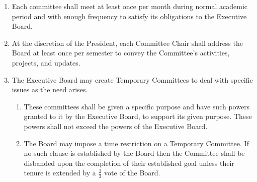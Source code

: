 \begin{enumerate}
    \item Each committee shall meet at least once per month during normal academic period and with enough frequency to satisfy its obligations to the Executive Board.

    \item At the discretion of the President, each Committee Chair shall address the Board at least once per semester to convey the Committee’s activities, projects, and updates.

    

    

    

    

    \item The Executive Board may create Temporary Committees to deal with specific issues as the need arises.
    \begin{enumerate}
        \item These committees shall be given a specific purpose and have such powers granted to it by the Executive Board, to support its given purpose. These powers shall not exceed the powers of the Executive Board.

        \item The Board may impose a time restriction on a Temporary Committee. If no such clause is established by the Board then the Committee shall be disbanded upon the completion of their established goal unless their tenure is extended by a $\frac{2}{3}$ vote of the Board.
    \end{enumerate}

\end{enumerate}
